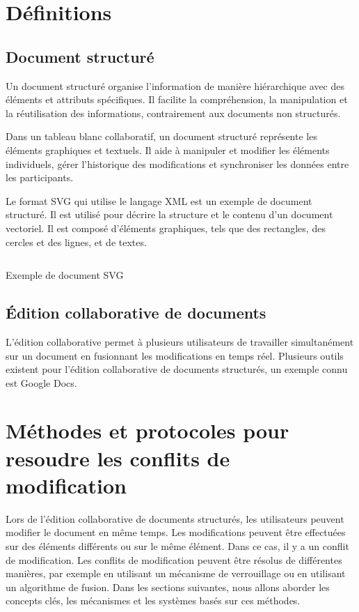 \section{Définitions}
\subsection{Document structuré}
Un document structuré organise l'information de manière hiérarchique avec des éléments et attributs spécifiques. Il facilite la compréhension, la manipulation et la réutilisation des informations, contrairement aux documents non structurés.

Dans un tableau blanc collaboratif, un document structuré représente les éléments graphiques et textuels. Il aide à manipuler et modifier les éléments individuels, gérer l'historique des modifications et synchroniser les données entre les participants.

Le format SVG qui utilise le langage XML est un exemple de document structuré. Il est utilisé pour décrire la structure et le contenu d'un document vectoriel. Il est composé d'éléments graphiques, tels que des rectangles, des cercles et des lignes, et de textes.

\begin{listing}[H]
    \inputminted{XML}{assets/code/svg-example.svg}
    \caption{Exemple de document SVG \label{fig:svg-example}}
\end{listing}

\subsection{Édition collaborative de documents}
L'édition collaborative permet à plusieurs utilisateurs de travailler simultanément sur un document en fusionnant les modifications en temps réel.
Plusieurs outils existent pour l'édition collaborative de documents structurés, un exemple connu est Google Docs.

\section{Méthodes et protocoles pour resoudre les conflits de modification}
Lors de l'édition collaborative de documents structurés, les utilisateurs
peuvent modifier le document en même temps. Les modifications peuvent être
effectuées sur des éléments différents ou sur le même élément. Dans ce cas, il y
a un conflit de modification. Les conflits de modification peuvent être résolus
de différentes manières, par exemple en utilisant un mécanisme de verrouillage
ou en utilisant un algorithme de fusion. Dans les sections suivantes, nous
allons aborder les concepts clés, les mécanismes et les systèmes basés sur ces méthodes.

